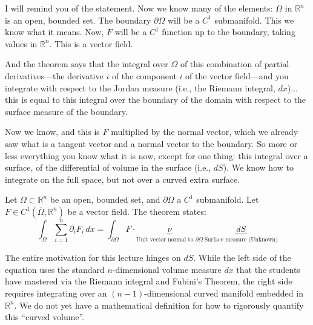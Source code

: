 \begin{spokenclean}[00:00:58 - 00:01:55]
I will remind you of the statement. Now we know many of the elements: $\Omega$ in $\mathbb{R}^n$ is an open, bounded set. The boundary $\partial \Omega$ will be a $C^1$ submanifold. This we know what it means. Now, $F$ will be a $C^1$ function up to the boundary, taking values in $\mathbb{R}^n$. This is a vector field. 

And the theorem says that the integral over $\Omega$ of this combination of partial derivatives—the derivative $i$ of the component $i$ of the vector field—and you integrate with respect to the Jordan measure (i.e., the Riemann integral, $dx$)... this is equal to this integral over the boundary of the domain with respect to the surface measure of the boundary.
\end{spokenclean}

\begin{spokenclean}[00:01:55 - 00:02:40]
Now we know, and this is $F$ multiplied by the normal vector, which we already saw what is a tangent vector and a normal vector to the boundary. So more or less everything you know what it is now, except for one thing: this integral over a surface, of the differential of volume in the surface (i.e., $dS$). We know how to integrate on the full space, but not over a curved extra surface.
\end{spokenclean}

\begin{orangeformula}
\begin{theorem}
Let $\Omega \subset \mathbb{R}^n$ be an open, bounded set, and $\partial \Omega$ a $C^1$ submanifold. Let $F \in C^1(\overline{\Omega}, \mathbb{R}^n)$ be a vector field. The theorem states:
\begin{equation} \label{eq:divergence}
\int_\Omega \sum_{i=1}^n \partial_i F_i \, dx = \int_{\partial \Omega} F \cdot \underbrace{\nu}_{\text{Unit vector normal to } \partial \Omega} \, \underbrace{dS}_{\text{Surface measure (Unknown)}}
\end{equation}
\end{theorem}
\end{orangeformula}

\begin{redundantexplanation}
The entire motivation for this lecture hinges on $dS$. While the left side of the equation uses the standard $n$-dimensional volume measure $dx$ that the students have mastered via the Riemann integral and Fubini's Theorem, the right side requires integrating over an $(n-1)$-dimensional curved manifold embedded in $\mathbb{R}^n$. We do not yet have a mathematical definition for how to rigorously quantify this ``curved volume''.
\end{redundantexplanation}

